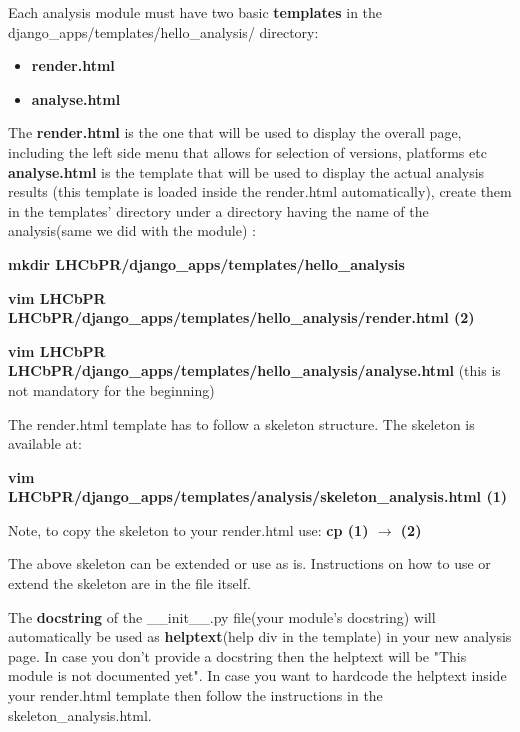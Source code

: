 \documentclass{lhcbnote}
\begin{document}
\vspace{4 mm}

Each analysis module must have two basic {\bf templates} in the django\_apps/templates/hello\_analysis/ directory:
 \begin{itemize}
\item
{\bf render.html}
\item
{\bf analyse.html}
\end{itemize}

The {\bf render.html} is the one that will be used to display the overall page, including the left side menu that allows for selection of versions, platforms etc
{\bf analyse.html} is the template that will be used to display the actual analysis results (this template is loaded inside the render.html automatically), 
create them in the templates' directory under a directory having the name of the analysis(same we did with the module) :

\vspace{2 mm}

{\bf mkdir LHCbPR/django\_apps/templates/hello\_analysis}

\vspace{2 mm}

{\bf vim LHCbPR LHCbPR/django\_apps/templates/hello\_analysis/render.html    (2)}

\vspace{2 mm}


{\bf vim LHCbPR LHCbPR/django\_apps/templates/hello\_analysis/analyse.html} (this is not mandatory for the beginning)
 \vspace{2 mm}

The render.html template has to follow a skeleton structure. The skeleton is available at:

\vspace{2 mm}

{\bf vim LHCbPR/django\_apps/templates/analysis/skeleton\_analysis.html     (1)}

Note, to copy the skeleton to your render.html use: {\bf cp (1) $\rightarrow$ (2)}	

\vspace{2 mm}

The above skeleton can be extended or use as is. Instructions on how to use or extend the skeleton are in the file itself. 

\vspace{2 mm}

The {\bf docstring} of the \_\_init\_\_.py file(your module's docstring) will automatically be used as {\bf helptext}(help div in the template) in your new analysis page.
In case you don't provide a docstring then the helptext will be "This module is not documented yet". In case you want to hardcode the helptext inside your render.html template
then follow the instructions in the skeleton\_analysis.html.
\end{document}
